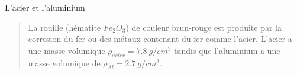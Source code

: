 \begin{doc}
	\label{doc:oxydation}
	\caption{L'acier et l'aluminium}
	
	\begin{quotation}
	
	
	La rouille (hématite $Fe_2O_3$) de couleur brun-rouge est produite par la corrosion du fer ou des métaux contenant du fer comme l'acier.
	L'acier a une masse volumique $\rho_{acier}=\num{7.8} \: g/cm^3$ tandis que l'aluminium a une masse volumique de $\rho_{Al}=\num{2.7} \: g/cm^3$.
\end{quotation}
\end{doc}
